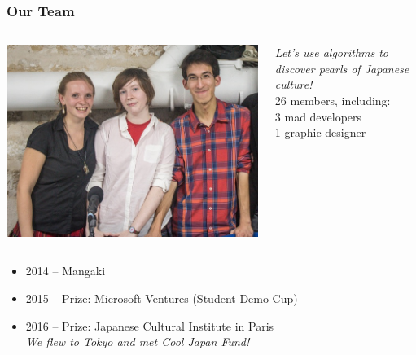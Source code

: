 \documentclass[]{beamer}
\begin{document}
\begin{frame}
  \frametitle{Our Team}
  \begin{columns}
  \begin{column}{0.5\textwidth}
    \includegraphics[width=\textwidth]{figures/trio.jpg}
  \end{column}
  \begin{column}{0.5\textwidth}
    {\em Let's use algorithms to discover pearls of Japanese culture!}\\[5mm]
    26 members, including:\\\hspace{7mm} 3 mad developers\\\hspace{14mm} 1 graphic designer
  \end{column}
  \end{columns}
  \vspace{2mm}
  \begin{itemize}
  \item 2014 -- \alert{Mangaki}
  \item 2015 -- Prize: Microsoft Ventures (Student Demo Cup)
  \item 2016 -- Prize: Japanese Cultural Institute in Paris\\[1mm]\pause\hfill\small\em We flew to Tokyo and met Cool Japan Fund!
  \end{itemize}
\end{frame}
\end{document}
